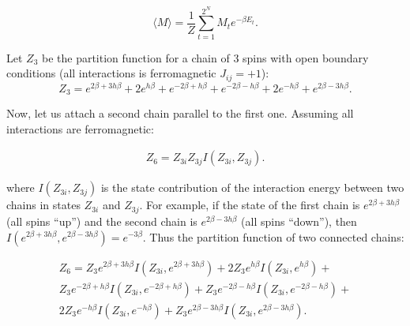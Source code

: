 \documentclass[preprint,12pt]{elsarticle}
\begin{document}
	\begin{equation}
		\langle M \rangle = \frac{1}{Z} \sum_{t = 1}^{2^N} M_t e^{-\beta E_t}.
		\label{magnetization}
	\end{equation}
	
	Let $Z_3$ be the partition function for a chain of 3 spins with open boundary conditions (all interactions is ferromagnetic $J_{ij} = +1$):
		\begin{equation}
		Z_3 = e^{2\beta + 3h\beta} + 2e^{h\beta} + e^{- 2\beta + h\beta } + e^{- 2\beta -h\beta}  + 2e^{-h\beta} + e^{2\beta - 3h\beta}.
		\label{eq:stat_3}
	\end{equation}

	Now, let us attach a second chain parallel to the first one. Assuming all interactions are ferromagnetic:
	
	\begin{equation}
		\label{eq:stat_z3}
		\begin{alignedat}{2}
			Z_6 =  Z_{3i}Z_{3j}I(Z_{3i},Z_{3j}).
		\end{alignedat}
	\end{equation}

	\noindent where $I(Z_{3i},Z_{3j})$ is the state contribution of the interaction energy between two chains in states $Z_{3i}$ and $Z_{3j}$. For example, if the state of the first chain is $e^{2\beta+3h\beta}$ (all spins ``up'') and the second chain is $e^{2\beta-3h\beta}$ (all spins ``down''), then $I(e^{2\beta+3h\beta}, e^{2\beta-3h\beta})=e^{-3\beta}$. Thus the partition function of two connected chains:
	
		\begin{equation}
			\label{eq:stat_6}
			\begin{alignedat}{3}
			Z_6 = Z_{3}e^{2\beta + 3h\beta}I(Z_{3i}, e^{2\beta + 3h\beta}) + 2Z_{3}e^{h\beta}I(Z_{3i}, e^{h\beta}) + \\
			Z_{3}e^{- 2\beta + h\beta }I(Z_{3i}, e^{- 2\beta + h\beta }) + Z_{3}e^{- 2\beta -h\beta}I(Z_{3i}, e^{- 2\beta -h\beta})  + \\
			2Z_{3}e^{-h\beta}I(Z_{3i}, e^{-h\beta}) + Z_{3}e^{2\beta - 3h\beta}I(Z_{3i}, e^{2\beta - 3h\beta}).
			\end{alignedat}
		\end{equation}
	
\end{document}
